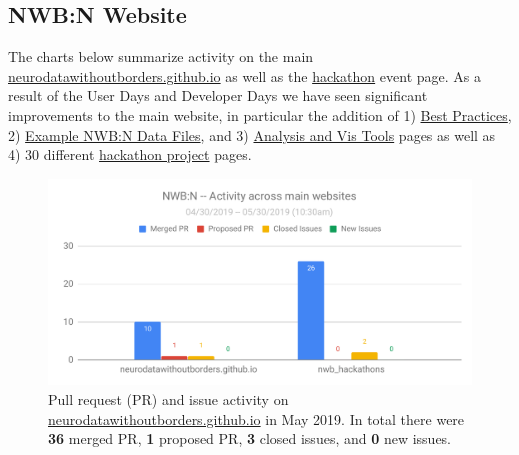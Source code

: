 \documentclass{article}
\begin{document}
\clearpage
\subsection{NWB:N Website}

The charts below summarize activity on the main \href{https://neurodatawithoutborders.github.io/}{neurodatawithoutborders.github.io} as well as the \href{https://neurodatawithoutborders.github.io/hackathon_events}{hackathon} event page. As a result of the User Days and Developer Days we have seen significant improvements to the main website, in particular the addition of 1) \href{https://neurodatawithoutborders.github.io/best_practices}{Best Practices}, 2) \href{https://neurodatawithoutborders.github.io/exampledata}{Example NWB:N Data Files}, and 3) \href{https://neurodatawithoutborders.github.io/tools}{Analysis and Vis Tools} pages as well as 4) 30 different \href{https://neurodatawithoutborders.github.io/nwb_hackathons/HCK06_2019_Janelia/#projects}{hackathon project} pages. 

\begin{figure}[h!]
  \begin{minipage}[c]{0.67\textwidth}
    \includegraphics[width=\textwidth]{figures/nwbn_activity_websites_pr_issues.pdf}
  \end{minipage}\hfill
  \begin{minipage}[c]{0.3\textwidth}
    \caption*{Pull request (PR) and issue activity on \href{https://neurodatawithoutborders.github.io/}{neurodatawithoutborders.github.io} in May 2019. In total there were \textbf{36} merged PR, \textbf{1} proposed PR, \textbf{3} closed issues, and \textbf{0} new issues.} 
  \end{minipage}
\end{figure}
\end{document}
